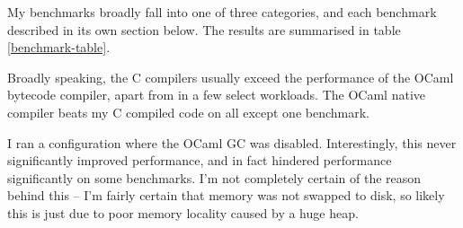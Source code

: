 \documentclass[12pt,a4paper,twoside,openright]{report}
\begin{document}
My benchmarks broadly fall into one of three categories, and each benchmark described in its own section below. The results are summarised in table \ref{benchmark-table}.

Broadly speaking, the C compilers usually exceed the performance of the OCaml
bytecode compiler, apart from in a few select workloads. The OCaml native
compiler beats my C compiled code on all except one benchmark.

I ran a configuration where the OCaml GC was disabled.
Interestingly, this never significantly improved performance, and in fact hindered
performance significantly on some benchmarks. I'm not completely certain of the
reason behind this -- I'm fairly certain that memory was not swapped to disk,
so likely this is just due to poor memory locality caused by a huge heap.
\end{document}
